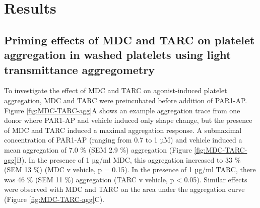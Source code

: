 \documentclass[11pt,twoside]{bristolthesis}
\begin{document}
\hypertarget{results-2}{%
\section{Results}\label{results-2}}

\hypertarget{priming-effects-of-mdc-and-tarc-on-platelet-aggregation-in-washed-platelets-using-light-transmittance-aggregometry}{%
\subsection{Priming effects of MDC and TARC on platelet aggregation in washed platelets using light transmittance aggregometry}\label{priming-effects-of-mdc-and-tarc-on-platelet-aggregation-in-washed-platelets-using-light-transmittance-aggregometry}}

To investigate the effect of MDC and TARC on agonist-induced platelet aggregation, MDC and TARC were preincubated before addition of PAR1-AP. Figure \ref{fig:MDC-TARC-agg}A shows an example aggregation trace from one donor where PAR1-AP and vehicle induced only shape change, but the presence of MDC and TARC induced a maximal aggregation response. A submaximal concentration of PAR1-AP (ranging from 0.7 to 1 µM) and vehicle induced a mean aggregation of 7.0 \% (SEM 2.9 \%) aggregation (Figure \ref{fig:MDC-TARC-agg}B). In the presence of 1 µg/ml MDC, this aggregation increased to 33 \% (SEM 13 \%) (MDC v vehicle, p = 0.15). In the presence of 1 µg/ml TARC, there was 46 \% (SEM 11 \%) aggregation (TARC v vehicle, p \textless{} 0.05). Similar effects were observed with MDC and TARC on the area under the aggregation curve (Figure \ref{fig:MDC-TARC-agg}C).
\end{document}

